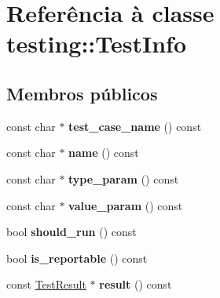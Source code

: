 \hypertarget{classtesting_1_1TestInfo}{\section{Referência à classe testing\-:\-:Test\-Info}
\label{classtesting_1_1TestInfo}
}
\subsection*{Membros públicos}
\begin{DoxyCompactItemize}
\item 
\hypertarget{classtesting_1_1TestInfo_a26d22556d04b94c9cd15e28d74fef91c}{const char $\ast$ {\bfseries test\-\_\-case\-\_\-name} () const }\label{classtesting_1_1TestInfo_a26d22556d04b94c9cd15e28d74fef91c}

\item 
\hypertarget{classtesting_1_1TestInfo_ab3d24cad310f0cde29a80b9a83949ff5}{const char $\ast$ {\bfseries name} () const }\label{classtesting_1_1TestInfo_ab3d24cad310f0cde29a80b9a83949ff5}

\item 
\hypertarget{classtesting_1_1TestInfo_af15d5c533a7237ffc183bc4c924dfcf4}{const char $\ast$ {\bfseries type\-\_\-param} () const }\label{classtesting_1_1TestInfo_af15d5c533a7237ffc183bc4c924dfcf4}

\item 
\hypertarget{classtesting_1_1TestInfo_a9671fbc0effcb32e98803888dc166a66}{const char $\ast$ {\bfseries value\-\_\-param} () const }\label{classtesting_1_1TestInfo_a9671fbc0effcb32e98803888dc166a66}

\item 
\hypertarget{classtesting_1_1TestInfo_a240c9fb051d7b0586ed380c6b4e729e4}{bool {\bfseries should\-\_\-run} () const }\label{classtesting_1_1TestInfo_a240c9fb051d7b0586ed380c6b4e729e4}

\item 
\hypertarget{classtesting_1_1TestInfo_a7ad90aeebb1d6fe3a43c6e3e3427e382}{bool {\bfseries is\-\_\-reportable} () const }\label{classtesting_1_1TestInfo_a7ad90aeebb1d6fe3a43c6e3e3427e382}

\item 
\hypertarget{classtesting_1_1TestInfo_addea8766df3b8abe4cc4103218a49a65}{const \hyperlink{classtesting_1_1TestResult}{Test\-Result} $\ast$ {\bfseries result} () const }\label{classtesting_1_1TestInfo_addea8766df3b8abe4cc4103218a49a65}

\end{DoxyCompactItemize}
